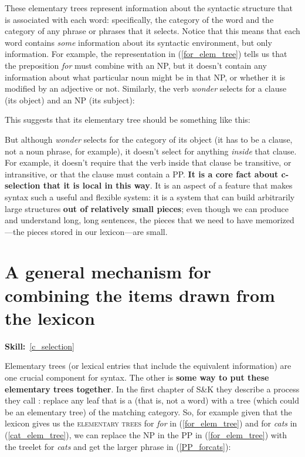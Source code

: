 \documentclass{article}
\begin{document}
These elementary trees represent information about the syntactic structure that is associated with each word: specifically, the category of the word and the category of any phrase or phrases that it selects.
Notice that this means that each word contains \emph{some} information about its syntactic environment, but only  information.
For example, the representation in (\ref{for_elem_tree}) tells us that the preposition \emph{for} must combine with an NP, but it doesn't contain any information about what particular noun might be in that NP, or whether it is modified by an adjective or not.
Similarly, the verb \emph{wonder} selects for a clause (its object) and an NP (its subject):
\begin{exe}
\end{exe}
This suggests that its elementary tree should be something like this:
\begin{exe}
    \label{wonder_elem_tree}
\end{exe}
 But although \emph{wonder} selects for the category of its object (it has to be a clause, not a noun phrase, for example), it doesn't select for anything \emph{inside} that clause.
 For example, it doesn't require that the verb inside that clause be transitive, or intransitive, or that the clause must contain a PP.
 \textbf{It is a core fact about c-selection that it is local in this way}.
 It is an aspect of a feature that makes syntax such a useful and flexible system: it is a system that can build arbitrarily large structures \textbf{out of relatively small pieces}; even though we can produce and understand long, long sentences, the pieces that we need to have memorized---the pieces stored in our lexicon---are small.
 
\section{A general mechanism for combining the items drawn from the lexicon}
\label{substitution}
\hfill{}\textbf{Skill:}~\ref{c_selection}

Elementary trees (or lexical entries that include the equivalent information) are one crucial component for syntax.
The other is \textbf{some way to put these elementary trees together}.
In the first chapter of  S\&K they describe a process they call :  replace any leaf that is a  (that is, not a word) with a tree (which could be an elementary tree) of the matching category.
So, for example given that the lexicon gives us the \textsc{elementary trees} for \emph{for} in (\ref{for_elem_tree}) and for \emph{cats} in (\ref{cat_elem_tree}),  we can replace the NP in the PP in (\ref{for_elem_tree}) with the treelet for \emph{cats} and get the larger phrase in (\ref{PP_forcats}):
\end{document}
